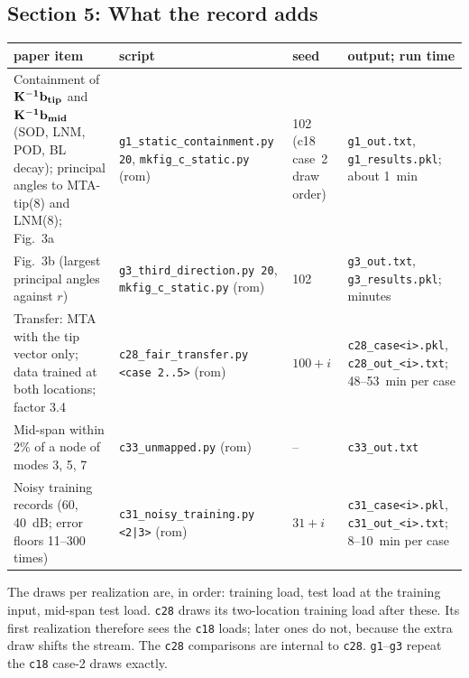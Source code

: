 \documentclass[10pt]{article}
\newcommand{\f}[1]{\texttt{#1}}
\begin{document}
\subsection*{Section 5: What the record adds}
\begin{longtable}{L{0.31\textwidth}L{0.25\textwidth}L{0.08\textwidth}L{0.25\textwidth}}
\toprule
paper item & script & seed & output; run time\\ \midrule
Containment of $\bf K^{-1}b_{tip}$ and $\bf K^{-1}b_{mid}$ (SOD, LNM, POD, BL decay); principal angles to MTA-tip(8) and LNM(8); Fig.~3a & \f{g1\_\allowbreak{}static\_\allowbreak{}containment.py 20}, \f{mkfig\_\allowbreak{}c\_\allowbreak{}static.py} (rom) & 102 (c18 case~2 draw order) & \f{g1\_\allowbreak{}out.txt}, \f{g1\_\allowbreak{}results.pkl}; about 1~min\\
Fig.~3b (largest principal angles against $r$) & \f{g3\_\allowbreak{}third\_\allowbreak{}direction.py 20}, \f{mkfig\_\allowbreak{}c\_\allowbreak{}static.py} (rom) & 102 & \f{g3\_\allowbreak{}out.txt}, \f{g3\_\allowbreak{}results.pkl}; minutes\\
Transfer: MTA with the tip vector only; data trained at both locations; factor 3.4 & \f{c28\_\allowbreak{}fair\_\allowbreak{}transfer.py <case 2..5>} (rom) & $100+i$ & \f{c28\_\allowbreak{}case<i>.pkl}, \f{c28\_\allowbreak{}out\_\allowbreak{}<i>.txt}; 48--53~min per case\\
Mid-span within 2\% of a node of modes 3, 5, 7 & \f{c33\_\allowbreak{}unmapped.py} (rom) & -- & \f{c33\_\allowbreak{}out.txt}\\
Noisy training records (60, 40~dB; error floors 11--300 times) & \f{c31\_\allowbreak{}noisy\_\allowbreak{}training.py <2|3>} (rom) & $31+i$ & \f{c31\_\allowbreak{}case<i>.pkl}, \f{c31\_\allowbreak{}out\_\allowbreak{}<i>.txt}; 8--10~min per case\\
\bottomrule
\end{longtable}
The draws per realization are, in order: training load, test load at the training input, mid-span test load. \f{c28} draws its two-location training load after these. Its first realization therefore sees the \f{c18} loads; later ones do not, because the extra draw shifts the stream. The \f{c28} comparisons are internal to \f{c28}. \f{g1}--\f{g3} repeat the \f{c18} case-2 draws exactly.
\end{document}
